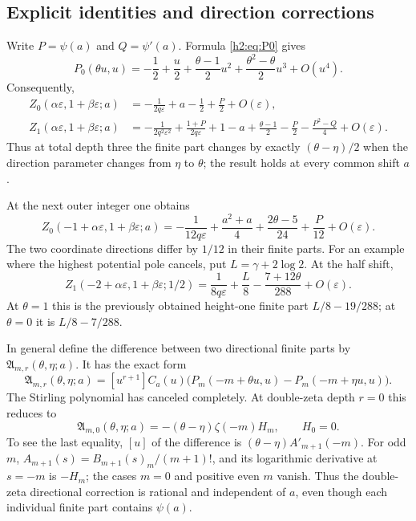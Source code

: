 \documentclass[11pt,a4paper]{article}
\theoremstyle{definition}
\theoremstyle{remark}
\numberwithin{equation}{section}
\begin{document}
\subsection{Explicit identities and direction corrections}

Write $P=\psi(a)$ and $Q=\psi'(a)$. Formula \eqref{h2:eq:P0}
gives
\[
 P_0(\theta u,u)=-\frac12+\frac u2
       +\frac{\theta-1}{2}u^2
       +\frac{\theta^2-\theta}{2}u^3+O(u^4).
\]
Consequently,
\begin{align}
 Z_0(\alpha\varepsilon,1+\beta\varepsilon;a)
 &= -\frac1{2q\varepsilon}+a-\frac12+\frac P2
                   +O(\varepsilon),\label{h2:eq:example00}\\
 Z_1(\alpha\varepsilon,1+\beta\varepsilon;a)
 &= -\frac1{2q^2\varepsilon^2}
      +\frac{1+P}{2q\varepsilon}
      +1-a+\frac{\theta-1}{2}-\frac P2
             -\frac{P^2-Q}{4}+O(\varepsilon).
 \label{h2:eq:example01}
\end{align}
Thus at total depth three the finite part changes by exactly
$(\theta-\eta)/2$ when the direction parameter changes from $\eta$
to $\theta$; the result holds at every common shift $a$.

At the next outer integer one obtains
\begin{equation}\label{h2:eq:example10}
 Z_0(-1+\alpha\varepsilon,1+\beta\varepsilon;a)
 =-\frac1{12q\varepsilon}
    +\frac{a^2+a}{4}+\frac{2\theta-5}{24}+\frac P{12}
                  +O(\varepsilon).
\end{equation}
The two coordinate directions differ by $1/12$ in their finite parts.
For an example where the highest potential pole cancels, put
$L=\gamma+2\log2$. At the half shift,
\begin{equation}\label{h2:eq:example21}
 Z_1(-2+\alpha\varepsilon,1+\beta\varepsilon;1/2)
    =\frac1{8q\varepsilon}+\frac L8-\frac{7+12\theta}{288}
                           +O(\varepsilon).
\end{equation}
At $\theta=1$ this is the previously obtained height-one finite part
$L/8-19/288$; at $\theta=0$ it is $L/8-7/288$.

In general define the difference between two directional finite parts
by $\mathfrak A_{m,r}(\theta,\eta;a)$. It has the exact form
\begin{equation}\label{h2:eq:anomaly}
 \mathfrak A_{m,r}(\theta,\eta;a)
 =[u^{r+1}]C_a(u)
       \bigl(P_m(-m+\theta u,u)-P_m(-m+\eta u,u)\bigr).
\end{equation}
The Stirling polynomial has canceled completely. At double-zeta depth
$r=0$ this reduces to
\begin{equation}\label{h2:eq:anomaly0}
 \mathfrak A_{m,0}(\theta,\eta;a)
   =-(\theta-\eta)\zeta(-m)H_m,
 \qquad H_0=0.
\end{equation}
To see the last equality, $[u]$ of the difference is
$(\theta-\eta)A'_{m+1}(-m)$. For odd $m$,
$A_{m+1}(s)=B_{m+1}(s)_m/(m+1)!$, and its logarithmic derivative
at $s=-m$ is $-H_m$; the cases $m=0$ and positive even $m$ vanish.
Thus the double-zeta directional correction is rational and independent
of $a$, even though each individual finite part contains $\psi(a)$.
\end{document}
